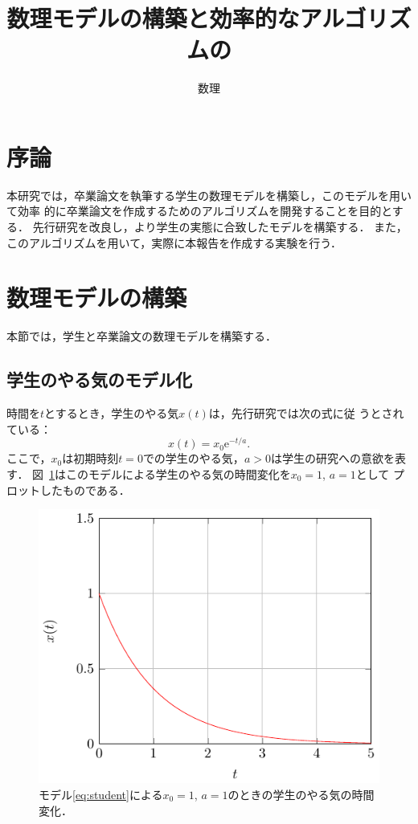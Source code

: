 \documentclass[dvipdfmx]{ampbt}
\title{数理モデルの構築と効率的なアルゴリズムの}     %
      {開発に関する研究}                             %
      {}                                             %
\author{数理}{三郎}             %
\newcommand{\rme}{\mathrm{e}}
\begin{document}
\ifoutputbody
\makeinsidecover                %
\makeabstract                   %
\maketoc                        %
\setcounter{page}{1}            %
\section{序論}
本研究では，卒業論文を執筆する学生の数理モデルを構築し，このモデルを用いて効率
的に卒業論文を作成するためのアルゴリズムを開発することを目的とする．
先行研究\cite{suuri2010}を改良し，より学生の実態に合致したモデルを構築する．
また，このアルゴリズムを用いて，実際に本報告を作成する実験を行う．

\section{数理モデルの構築}
本節では，学生と卒業論文の数理モデルを構築する．

\subsection{学生のやる気のモデル化}
時間を$t$とするとき，学生のやる気$x(t)$は，先行研究\cite{suuri2010}では次の式に従
うとされている：
\begin{equation}\label{eq:student}
  x(t)=x_0 \rme^{-t/a}.
\end{equation}
ここで，$x_0$は初期時刻$t=0$での学生のやる気，$a>0$は学生の研究への意欲を表す．
図~\ref{fig:student}はこのモデルによる学生のやる気の時間変化を$x_0=1$, $a=1$として
プロットしたものである．
\begin{figure}[htbp]
  \centering
  \includegraphics{ampbt_figure.pdf}
  \caption{モデル\eqref{eq:student}による$x_0=1$, $a=1$のときの学生のやる気の時間
    変化．}
  \label{fig:student}
\end{figure}
\end{document}
